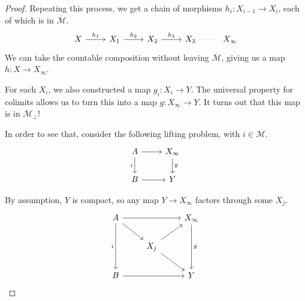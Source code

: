 \documentclass[main.tex]{subfiles}
\begin{document}
\begin{proof}
  Repeating this process, we get a chain of morphisms $h_{i}\colon X_{i-1} \to X_{i}$, each of which is in $\overline{\mathcal{M}}$.
  \begin{equation*}
    \begin{tikzcd}
      X
      \arrow[r, "h_{1}"]
      & X_{1}
      \arrow[r, "h_{2}"]
      & X_{2}
      \arrow[r, "h_{3}"]
      & X_{3}
      \arrow[r, dotted, no head]
      & X_{\infty}
    \end{tikzcd}
  \end{equation*}
  We can take the countable composition without leaving $\overline{\mathcal{M}}$, giving us a map $h\colon X \to X_{\infty}$.

  For each $X_{i}$, we also constructed a map $g_{i}\colon X_{i} \to Y$. The universal property for colimits allows us to turn this into a map $g\colon X_{\infty} \to Y$. It turns out that this map is in $\mathcal{M}_{\perp}$!

  In order to see that, consider the following lifting problem, with $i \in \mathcal{M}$.
  \begin{equation*}
    \begin{tikzcd}
      A
      \arrow[r]
      \arrow[d, swap, "i"]
      & X_{\infty}
      \arrow[d, "g"]
      \\
      B
      \arrow[r]
      & Y
    \end{tikzcd}
  \end{equation*}

  By assumption, $Y$ is compact, so any map $Y \to X_{\infty}$ factors through some $X_{j}$.
  \begin{equation}
    \label{eq:soa_partly_built_square}
    \begin{tikzcd}
      A
      \arrow[rr]
      \arrow[dd, swap, "i"]
      \arrow[rd]
      && X_{\infty}
      \arrow[dd, "g"]
      \\
      & X_{j}
      \arrow[ur]
      \arrow[dr]
      \\
      B
      \arrow[rr]
      && Y
    \end{tikzcd}
  \end{equation}


\end{proof}
\end{document}
